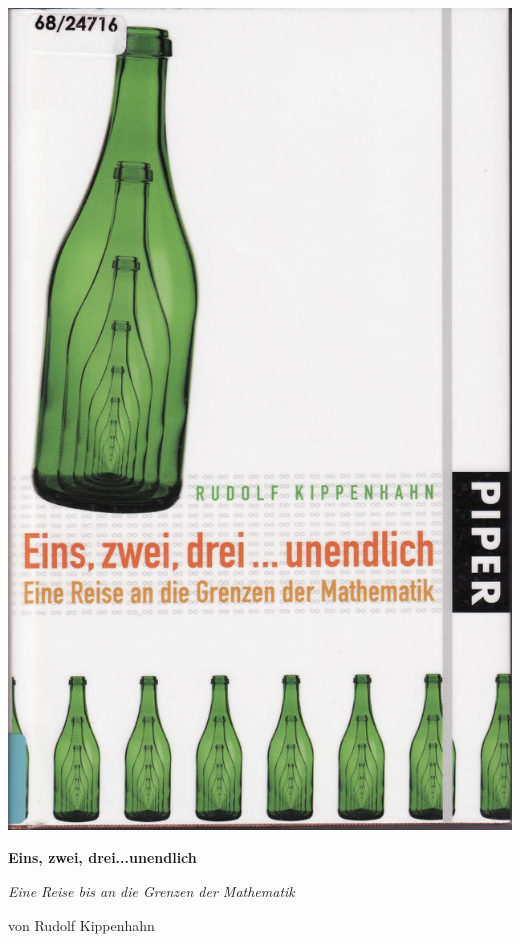 \documentclass[a4paper,12pt]{article}
\begin{document}
\begin{center}
\includegraphics[width=12 cm]{IMG.pdf}
\end{center}

\newpage

\begin{center}
 \large{\textbf{Eins, zwei, drei...unendlich}}\newline 
\end{center}
\begin{center}
\large{\textit{Eine Reise bis an die Grenzen der Mathematik}}\newline
\end{center}

\begin{center}
\large{von Rudolf Kippenhahn}\newline
\end{center}
\newline
\end{document}
